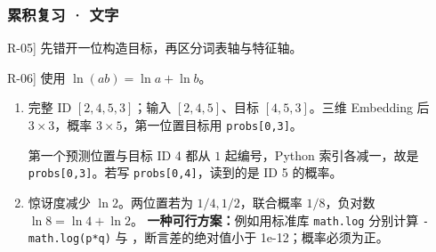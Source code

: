 \subsubsection*{累积复习 · 文字}
\begin{answerhints}
\item[\hyperref[exercise:review-token-pipeline]{R-05}] \leavevmode{}\label{hint:review-token-pipeline}先错开一位构造目标，再区分词表轴与特征轴。
\item[\hyperref[exercise:review-cross-entropy]{R-06}] \leavevmode{}\label{hint:review-cross-entropy}使用 $\ln(ab)=\ln a+\ln b$。
\end{answerhints}
\begin{enumerate}[label={},leftmargin=4.8em,itemsep=4pt]
\item[\textbf{\hyperref[exercise:review-token-pipeline]{R-05.}}] \leavevmode{}\label{solution:R-05}\label{solution:review-token-pipeline}完整 ID $[2,4,5,3]$；输入 $[2,4,5]$、目标 $[4,5,3]$。三维 Embedding 后 $3\times3$，概率 $3\times5$，第一位置目标用 \texttt{probs[0,3]}。\par 第一个预测位置与目标 ID 4 都从 $1$ 起编号，Python 索引各减一，故是 \texttt{probs[0,3]}。若写 \texttt{probs[0,4]}，读到的是 ID 5 的概率。
\item[\textbf{\hyperref[exercise:review-cross-entropy]{R-06.}}] \leavevmode{}\label{solution:R-06}\label{solution:review-cross-entropy}惊讶度减少 $\ln2$。两位置若为 $1/4,1/2$，联合概率 $1/8$，负对数 $\ln8=\ln4+\ln2$。
\textbf{一种可行方案：}例如用标准库 \texttt{math.log} 分别计算 \texttt{-math.log(p*q)} 与 ，断言差的绝对值小于 1e-12；概率必须为正。
\end{enumerate}
